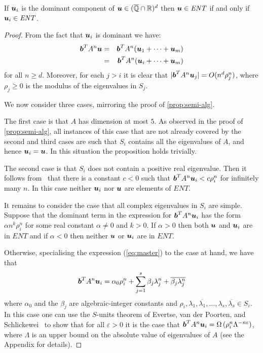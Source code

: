 \begin{proposition}
  If $\boldsymbol{u}_i$ is the dominant component of $\boldsymbol{u}
  \in (\overline{\mathbb{Q}}\cap\mathbb{R})^d$ then $\boldsymbol{u}\in\mathit{ENT}$ if and only
if $\boldsymbol{u}_i \in \mathit{ENT}$.
\label{prop:dominant}
\end{proposition}
\begin{proof}
From the fact that $\boldsymbol{u}_i$ is dominant we have:
\begin{eqnarray}
 \myvector{b}^TA^n\myvector{u}&=&
   \myvector{b}^TA^n(\myvector{u}_1+\cdots+\myvector{u}_m) \notag\\
&=&\myvector{b}^TA^n(\myvector{u}_i+\cdots+\myvector{u}_m)
\label{eq:part}
\end{eqnarray}
for all $n\geq d$.  Moreover, for each $j>i$ it is clear that
  $|\boldsymbol{b}^TA^n\boldsymbol{u}_j| = O(n^d\rho_j^n)$, where
  $\rho_j\geq 0$ is the modulus of the eigenvalues in $S_j$.

  We now consider three cases, mirroring the proof of
  \cref{prop:semi-alg}.

  The first case is that $A$ has dimension at most $5$.  As observed
  in the proof of \cref{prop:semi-alg}, all instances of
  this case that are not already covered by the second and third cases
  are such that $S_i$ contains all the eigenvalues of $A$, and hence
  $\boldsymbol{u}_i=\boldsymbol{u}$.  In this situation the proposition
  holds trivially.

  The second case is that $S_i$ does not contain a positive real
  eigenvalue.  Then it follows from~\cite[Lemma 4]{Bra06} that there
  is a constant $c<0$ such that
  $\boldsymbol{b}^TA^n\boldsymbol{u}_i<c\rho_i^n$ for infinitely many
  $n$.  In this case neither $\boldsymbol{u}_i$ nor $\boldsymbol{u}$
  are elements of $\mathit{ENT}$.

  It remains to consider the case that all complex eigenvalues in
  $S_i$ are simple.  Suppose that the dominant term in the expression
  for $\boldsymbol{b}^TA^n\boldsymbol{u}_i$ has the form $\alpha
  n^k\rho_i^n$ for some real constant $\alpha\neq 0$ and $k>0$.  If
  $\alpha>0$ then both $\boldsymbol{u}$ and $\boldsymbol{u}_i$ are in
  $\mathit{ENT}$ and if $\alpha<0$ then neither $\boldsymbol{u}$ or
  $\boldsymbol{u}_i$ are in $\mathit{ENT}$.

  Otherwise, specialising the expression (\ref{eq:master}) to the case
  at hand, we have that
\begin{gather}
\label{eq:diag}
 \myvector{b}^TA^n\myvector{u}_i = \alpha_0 \rho_i^n+\sum\limits_{j=1}^s\beta_j\lambda_j^n+\overline{\beta_j\lambda_j^n}
\end{gather}
where $\alpha_0$ and the $\beta_j$ are algebraic-integer constants and
$\rho_i,\lambda_1,\overline{\lambda_1},\ldots,\lambda_s,\overline{\lambda_s} \in S_i$.  In this case one can use the
$S$-units theorem of Evertse, van der Poorten, and
Schlickewei~\cite{Evertse84,PS82} to show that for all $\varepsilon>0$ it
is the case that $\boldsymbol{b}^TA^n\boldsymbol{u}_i =\Omega\left(
  \rho_i^n \Lambda^{-n\varepsilon} \right)$,
where $\Lambda$ is an upper bound on the absolute value of eigenvalues of $A$ (see the Appendix for details).


\end{proof}
